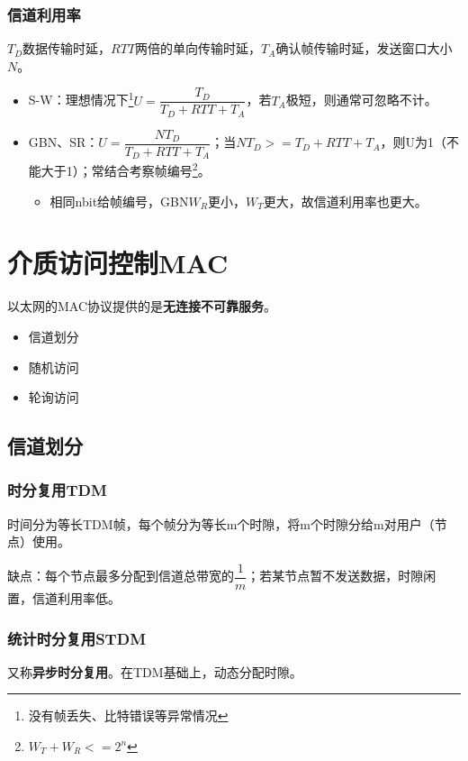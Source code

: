 \subsubsection{信道利用率}
\(T_D\)数据传输时延，\(RTT\)两倍的单向传输时延，\(T_A\)确认帧传输时延，发送窗口大小\(N\)。
\begin{itemize}
    \item S-W：理想情况下\footnote{没有帧丢失、比特错误等异常情况}\(U = \dfrac{T_D}{T_D + RTT + T_A}\)，若\(T_A\)极短，则通常可忽略不计。
    \item GBN、SR：\(U = \dfrac{NT_D}{T_D + RTT + T_A}\)；当\(NT_D >= T_D + RTT + T_A\)，则U为1（不能大于1）；常结合考察帧编号\footnote{\(W_T + W_R <= 2^n\)}。
    \begin{itemize}
        \item 相同nbit给帧编号，GBN\(W_R\)更小，\(W_T\)更大，故信道利用率也更大。
    \end{itemize}
\end{itemize}


\section{介质访问控制MAC}

以太网的MAC协议提供的是\textbf{无连接不可靠服务}。

\begin{itemize}
    \item 信道划分
    \item 随机访问
    \item 轮询访问
\end{itemize}

\subsection{信道划分}

\subsubsection{时分复用TDM}
时间分为等长TDM帧，每个帧分为等长m个时隙，将m个时隙分给m对用户（节点）使用。

缺点：每个节点最多分配到信道总带宽的\(\dfrac{1}{m}\)；若某节点暂不发送数据，时隙闲置，信道利用率低。


\subsubsection{统计时分复用STDM}
又称\textbf{异步时分复用}。在TDM基础上，动态分配时隙。

